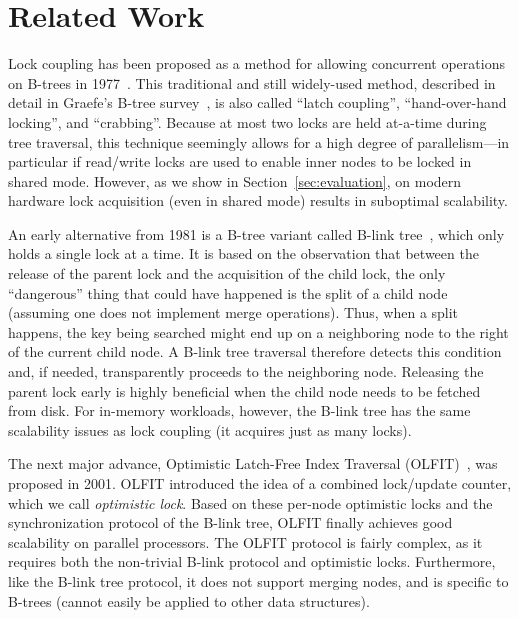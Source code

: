 \documentclass[11pt]{article}
\begin{document}
\newpage
\section{Related Work}\label{sec:related}

Lock coupling has been proposed as a method for allowing concurrent operations on B-trees in 1977~\cite{DBLP:journals/acta/BayerS77}.
This traditional and still widely-used method, described in detail in Graefe's B-tree survey~\cite{DBLP:journals/ftdb/Graefe11}, is also called ``latch coupling'', ``hand-over-hand locking'', and ``crabbing''.
Because at most two locks are held at-a-time during tree traversal, this technique seemingly allows for a high degree of parallelism---in particular if read/write locks are used to enable inner nodes to be locked in shared mode.
However, as we show in Section~\ref{sec:evaluation}, on modern hardware lock acquisition (even in shared mode) results in suboptimal scalability.

An early alternative from 1981 is a B-tree variant called B-link tree~\cite{DBLP:journals/tods/LehmanY81}, which only holds a single lock at a time.
It is based on the observation that between the release of the parent lock and the acquisition of the child lock, the only ``dangerous'' thing that could have happened is the split of a child node (assuming one does not implement merge operations).
Thus, when a split happens, the key being searched might end up on a neighboring node to the right of the current child node.
A B-link tree traversal therefore detects this condition and, if needed, transparently proceeds to the neighboring node.
Releasing the parent lock early is highly beneficial when the child node needs to be fetched from disk.
For in-memory workloads, however, the B-link tree has the same scalability issues as lock coupling (it acquires just as many locks).

The next major advance, Optimistic Latch-Free Index Traversal (OLFIT)~\cite{DBLP:conf/vldb/ChaHKK01}, was proposed in 2001.
OLFIT introduced the idea of a combined lock/update counter, which we call {\em optimistic lock}. %
Based on these per-node optimistic locks and the synchronization protocol of the B-link tree, OLFIT finally achieves good scalability on parallel processors.
The OLFIT protocol is fairly complex, as it requires both the non-trivial B-link protocol and optimistic locks.
Furthermore, like the B-link tree protocol, it does not support merging nodes, and is specific to B-trees (cannot easily be applied to other data structures).
\end{document}
